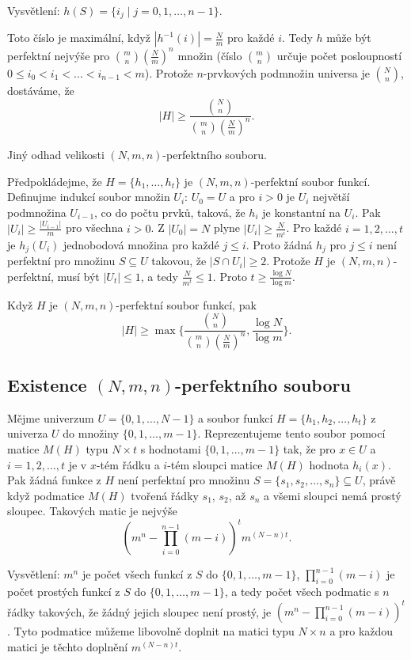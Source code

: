 \documentclass[a4paper,12pt]{article}
\begin{document}
Vysvětlení: $h(S)=\{i_j\mid j=0,1,\dots,n-1\}$.

Toto číslo je maximální, když $|h^{-1}(
i)|=\frac Nm$ pro každé $i$. 
Tedy $h$ může být perfektní nejvýše pro $\binom 
mn(\frac Nm)^n$ 
množin (číslo $\binom mn$ určuje počet posloupností 
$0\le i_0<i_1<\dots<i_{n-1}<m$). Protože $n$-prvkových 
podmnožin universa je $\binom Nn$, dostáváme, že 
$$|H|\ge\frac {\binom Nn}{\binom mn(\frac Nm)^n}.$$

Jiný odhad velikosti $(N,m,n)$-perfektního souboru.

Předpokládejme, že $H=\{h_1,\dots,h_t\}$ je 
$(N,m,n)$-perfektní soubor funkcí.  Definujme indukcí 
soubor množin $U_i$:\newline 
$U_0=U$ a pro 
$i>0$ je $U_i$ největší podmnožina $U_{i-1}$, co do počtu 
prvků, 
taková, že $h_i$ je konstantní na $U_i$.  Pak $|U_i|\ge\frac {
|U_{i-1}|}m$ 
pro všechna $i>0$.  Z $|U_0|=N$ plyne $|U_i|\ge\frac N{m^i}$.  Pro každé 
$i=1,2,\dots,t$ je $h_j(U_i)$ jednobodová množina pro každé 
$j\le i$.  Proto žádná $h_j$ pro $j\le i$ není perfektní pro 
množinu $S\subseteq U$ takovou, že $|S\cap U_i|\ge 2$.  Protože $
H$ je 
$(N,m,n)$-perfektní, musí být $|U_t|\le 1$, a tedy $\frac 
N{m^t}\le 1$.  Proto 
$t\ge\frac {\log N}{\log m}$.    

\begin{veta}Když $H$ je $(N,m,n)$-perfektní soubor 
funkcí, pak 
$$|H|\ge\max\{\frac {\binom Nn}{\binom mn(\frac Nm)^n},\frac {\log 
N}{\log m}\}.$$
\end{veta}

\subsection{
Existence $(N,m,n)$-perfektního souboru
}

Mějme univerzum $U=\{0,1,\dots,N-1\}$ a soubor 
funkcí $H=\{h_1,h_2,\dots,h_t\}$ z univerza $U$ do množiny 
$\{0,1,\dots,m-1\}$.  Reprezentujeme tento soubor pomocí 
matice $M(H)$ typu $N\times t$ s hodnotami $\{0,1,\dots,m-1\}$ tak, 
že pro $x\in U$ a $i=1,2,\dots,t$ je 
v $x$-tém řádku a $i$-tém sloupci matice $M(H)$ 
hodnota $h_i(x)$. Pak žádná funkce z $H$ 
není perfektní pro množinu $S=\{s_1,s_2,\dots,s_n\}\subseteq 
U$, 
právě když podmatice $M(H)$ tvoře\-ná 
řádky $s_1$, $s_2$, až $s_n$ a všemi sloupci nemá prostý sloupec. 
Ta\-ko\-vých matic je nejvýše 
$$(m^n-\prod_{i=0}^{n-1}(m-i))^tm^{(N-n)t}.$$

Vysvětlení:  $m^n$ je počet všech funkcí z $
S$ do 
$\{0,1,\dots,m-1\}$, $\prod_{i=0}^{n-1}(m-i)$ je počet prostých funkcí z $
S$ 
do $\{0,1,\dots,m-1\}$, a tedy počet všech podmatic s $n$ 
řádky takových, že žádný jejich sloupec není prostý, je 
$(m^n-\prod_{i=0}^{n-1}(m-i))^t$.  Tyto podmatice můžeme 
libovolně doplnit na matici typu $N\times n$ a pro každou 
matici je těchto doplnění $m^{(N-n)t}$.  
\end{document}
